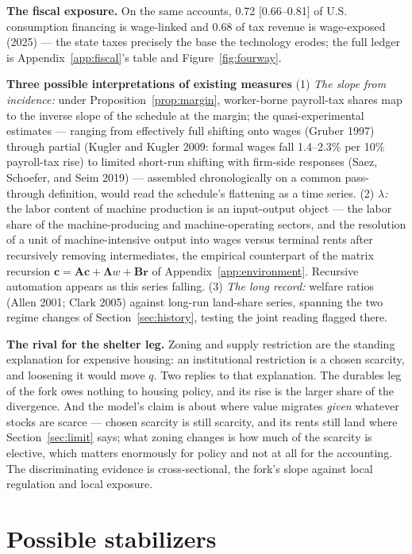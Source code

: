 \documentclass[12pt]{article}
\theoremstyle{plain}
\begin{document}
\textbf{The fiscal exposure.} On the same accounts, 0.72 [0.66--0.81] of U.S. consumption financing is wage-linked and 0.68 of tax revenue is wage-exposed (2025) --- the state taxes precisely the base the technology erodes; the full ledger is Appendix~\ref{app:fiscal}'s table and Figure~\ref{fig:fourway}.

\textbf{Three possible interpretations of existing measures} (1) \emph{The slope from incidence:} under Proposition~\ref{prop:margin}, worker-borne payroll-tax shares map to the inverse slope of the schedule at the margin; the quasi-experimental estimates --- ranging from effectively full shifting onto wages (Gruber 1997) through partial (Kugler and Kugler 2009: formal wages fall 1.4--2.3\% per 10\% payroll-tax rise) to limited short-run shifting with firm-side responses (Saez, Schoefer, and Seim 2019) --- assembled chronologically on a common pass-through definition, would read the schedule's flattening as a time series. (2) \emph{$\lambda$:} the labor content of machine production is an input-output object --- the labor share of the machine-producing and machine-operating sectors, and the resolution of a unit of machine-intensive output into wages versus terminal rents after recursively removing intermediates, the empirical counterpart of the matrix recursion $\mathbf{c} = \mathbf{A}\mathbf{c} + \boldsymbol{\Lambda}w + \mathbf{B}\mathbf{r}$ of Appendix~\ref{app:environment}. Recursive automation appears as this series falling. (3) \emph{The long record:} welfare ratios (Allen 2001; Clark 2005) against long-run land-share series, spanning the two regime changes of Section~\ref{sec:history}, testing the joint reading flagged there.

\textbf{The rival for the shelter leg.} Zoning and supply restriction are the standing explanation for expensive housing: an institutional restriction is a chosen scarcity, and loosening it would move $q$. Two replies to that explanation. The durables leg of the fork owes nothing to housing policy, and its rise is the larger share of the divergence. And the model's claim is about where value migrates \emph{given} whatever stocks are scarce --- chosen scarcity is still scarcity, and its rents still land where Section~\ref{sec:limit} says; what zoning changes is how much of the scarcity is elective, which matters enormously for policy and not at all for the accounting. The discriminating evidence is cross-sectional, the fork's slope against local regulation and local exposure.

\section{Possible stabilizers}\label{sec:stabilizers}
\end{document}

